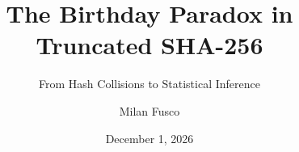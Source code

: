 \documentclass[10pt,aspectratio=169]{beamer}
\title[Birthday Paradox in Truncated SHA-256]{The Birthday Paradox in Truncated SHA-256}
\subtitle{From Hash Collisions to Statistical Inference}
\author[M.~Fusco]{Milan Fusco}
\institute[YSU]{STAT 3743: Probability \& Statistics \\ Youngstown State University}
\date{December 1, 2026}
\begin{document}
\begin{frame}
  \titlepage
\end{frame}
\end{document}
